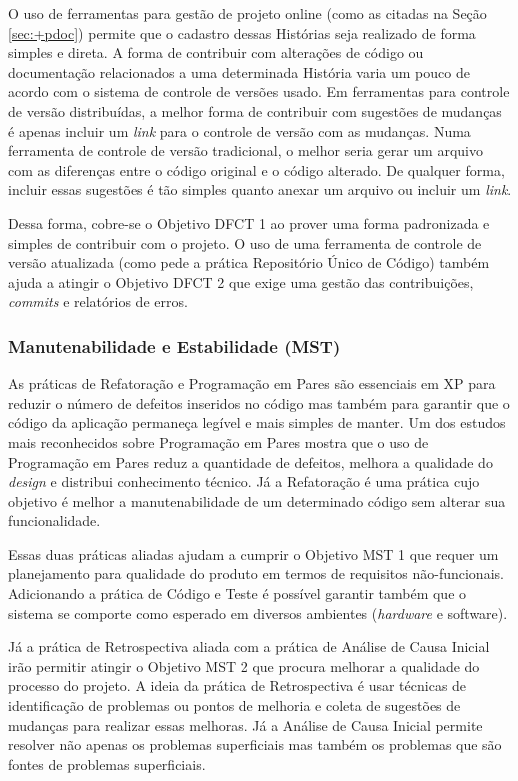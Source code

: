 O uso de ferramentas para gestão de projeto online (como as citadas na
Seção \ref{sec:+pdoc}) permite que o cadastro dessas Histórias seja
realizado de forma simples e direta. A forma de contribuir com
alterações de código ou documentação relacionados a uma determinada
História varia um pouco de acordo com o sistema de controle de versões
usado. Em ferramentas para controle de versão distribuídas, a melhor
forma de contribuir com sugestões de mudanças é apenas incluir um
\textit{link} para o controle de versão com as mudanças. Numa
ferramenta de controle de versão tradicional, o melhor seria gerar um
arquivo com as diferenças entre o código original e o código
alterado. De qualquer forma, incluir essas sugestões é tão simples
quanto anexar um arquivo ou incluir um \textit{link}.

Dessa forma, cobre-se o Objetivo DFCT 1 ao prover uma forma
padronizada e simples de contribuir com o projeto. O uso de uma
ferramenta de controle de versão atualizada (como pede a prática
Repositório Único de Código) também ajuda a atingir o Objetivo DFCT 2
que exige uma gestão das contribuições, \textit{commits} e relatórios
de erros.

\subsubsection{Manutenabilidade e Estabilidade (MST)}
\label{sec:+mst}

As práticas de Refatoração e Programação em Pares são essenciais em XP
para reduzir o número de defeitos inseridos no código mas também para
garantir que o código da aplicação permaneça legível e mais simples de
manter. Um dos estudos mais reconhecidos sobre Programação em Pares
\cite{Williams2000} mostra que o uso de Programação em Pares reduz a
quantidade de defeitos, melhora a qualidade do \textit{design} e
distribui conhecimento técnico. Já a Refatoração \cite{Refac01} é uma
prática cujo objetivo é melhor a manutenabilidade de um determinado
código sem alterar sua funcionalidade.

Essas duas práticas aliadas ajudam a cumprir o Objetivo MST 1 que
requer um planejamento para qualidade do produto em termos de
requisitos não-funcionais. Adicionando a prática de Código e Teste é
possível garantir também que o sistema se comporte como esperado em
diversos ambientes (\textit{hardware} e software).

Já a prática de Retrospectiva aliada com a prática de Análise de Causa
Inicial irão permitir atingir o Objetivo MST 2 que procura melhorar a
qualidade do processo do projeto. A ideia da prática de Retrospectiva
\cite{Derby2006} é usar técnicas de identificação de problemas ou
pontos de melhoria e coleta de sugestões de mudanças para realizar
essas melhoras. Já a Análise de Causa Inicial permite resolver não
apenas os problemas superficiais mas também os problemas que são
fontes de problemas superficiais.

